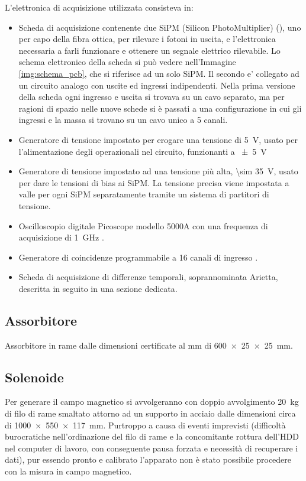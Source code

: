 L'elettronica di acquisizione utilizzata consisteva in:
\begin{itemize}
\item Scheda di acquisizione contenente due SiPM (Silicon PhotoMultiplier) (\cite{bib:SiPM}), uno per capo della fibra ottica, per rilevare i fotoni in uscita, e l'elettronica necessaria a farli funzionare e ottenere un segnale elettrico rilevabile. Lo schema elettronico della scheda si pu\`o vedere nell'Immagine \ref{img:schema_pcb}, che si riferisce ad un solo SiPM. Il secondo e' collegato ad un circuito analogo con uscite ed ingressi indipendenti. Nella prima versione della scheda ogni ingresso e uscita si trovava su un cavo separato, ma per ragioni di spazio nelle nuove schede si \`e passati a una configurazione in cui gli ingressi e la massa si trovano su un cavo unico a 5 canali.


\item Generatore di tensione impostato per erogare una tensione di \SI{5}{\volt}, usato per l'alimentazione degli operazionali nel circuito, funzionanti a \SI{+-5}{\volt}

\item Generatore di tensione impostato ad una tensione pi\`u alta, \SI{\sim 35}{\volt}, usato per dare le tensioni di bias ai SiPM. La tensione precisa viene impostata a valle per ogni SiPM separatamente tramite un sistema di partitori di tensione.

\item Oscilloscopio digitale Picoscope modello 5000A con una frequenza di acquisizione di \SI{1}{\GHz} \cite{bib:datasheet_pico}.

\item Generatore di coincidenze programmabile a 16 canali di ingresso \cite{bib:articolo_garfa}.

\item Scheda di acquisizione di differenze temporali, soprannominata Arietta, descritta in seguito in una  sezione dedicata.

\end{itemize}

\subsection{Assorbitore}
Assorbitore in rame dalle dimensioni certificate al mm di \SI{600x25x25}{\milli\metre}.

\subsection{Solenoide}
Per generare il campo magnetico si avvolgeranno con doppio avvolgimento \SI{20}{\kg} di filo di rame smaltato attorno ad un supporto in acciaio dalle dimensioni circa
di \SI{1000x550x117}{\milli\metre}.
Purtroppo a causa  di eventi imprevisti (difficolt\`a burocratiche nell'ordinazione del filo di rame e la concomitante rottura dell'HDD nel computer di lavoro, con conseguente pausa forzata e necessit\`a di recuperare i dati), pur essendo pronto e calibrato l'apparato non \`e stato possibile procedere con la misura in campo magnetico.

